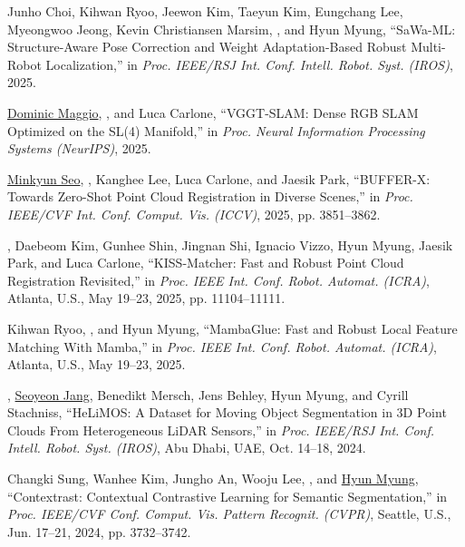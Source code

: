 
\begin{pubSubsectionNum}
    \item Junho Choi, Kihwan Ryoo, Jeewon Kim, Taeyun Kim, Eungchang Lee, Myeongwoo Jeong, Kevin Christiansen Marsim, \hyungtaelim, and Hyun Myung, ``SaWa-ML: Structure-Aware Pose Correction and Weight Adaptation-Based Robust Multi-Robot Localization,'' in \textit{Proc. IEEE/RSJ Int. Conf. Intell. Robot. Syst. (IROS)}, 2025. \accepted
    \item \underline{Dominic Maggio}, \underline{\hyungtaelim}, and Luca Carlone, ``VGGT-SLAM: Dense RGB SLAM Optimized on the SL(4) Manifold,'' in \textit{Proc. Neural Information Processing Systems (NeurIPS)}, 2025. \accepted
    \item \underline{Minkyun Seo}, \underline{\hyungtaelim}, Kanghee Lee, Luca Carlone, and Jaesik Park, ``BUFFER-X: Towards Zero-Shot Point Cloud Registration in Diverse Scenes,'' in \textit{Proc. IEEE/CVF Int. Conf. Comput. Vis. (ICCV)}, 2025, pp. 3851--3862.
    \item \hyungtaelim, Daebeom Kim, Gunhee Shin, Jingnan Shi, Ignacio Vizzo, Hyun Myung, Jaesik Park, and Luca Carlone, ``KISS-Matcher: Fast and Robust Point Cloud Registration Revisited,'' in \textit{Proc. IEEE Int. Conf. Robot. Automat. (ICRA)}, Atlanta, U.S., May 19--23, 2025, pp. 11104--11111.
    \item Kihwan Ryoo, \hyungtaelim, and Hyun Myung, ``MambaGlue: Fast and Robust Local Feature Matching With Mamba,'' in \textit{Proc. IEEE Int. Conf. Robot. Automat. (ICRA)}, Atlanta, U.S., May 19--23, 2025. \accepted
    \item \underline{\hyungtaelim}, \underline{Seoyeon Jang}, Benedikt Mersch, Jens Behley, Hyun Myung, and Cyrill Stachniss, ``HeLiMOS: A Dataset for Moving Object Segmentation in 3D Point Clouds From Heterogeneous LiDAR Sensors,'' in \textit{Proc. IEEE/RSJ Int. Conf. Intell. Robot. Syst. (IROS)}, Abu Dhabi, UAE, Oct. 14--18, 2024.
    \item Changki Sung, Wanhee Kim, Jungho An, Wooju Lee, \underline{\hyungtaelim}, and \underline{Hyun Myung}, ``Contextrast: Contextual Contrastive Learning for Semantic Segmentation,'' in \textit{Proc. IEEE/CVF Conf. Comput. Vis. Pattern Recognit. (CVPR)}, Seattle, U.S., Jun. 17--21, 2024, pp. 3732--3742.

\end{pubSubsectionNum}
